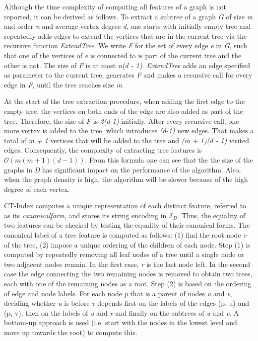 \documentclass{l4proj}
\newcommand{\fancyI}{\mathcal{I}}
\begin{document}
Although the time complexity of computing all features of a graph is not reported, it can be derived as follows. To extract a subtree of a graph \emph{G} of size \emph{m} and order \emph{n} and average vertex degree \emph{d}, one starts with initially empty tree and repeatedly adds edges to extend the vertices that are in the current tree via the recursive function \emph{ExtendTree}. We write \emph{F} for the set of every edge \emph{e} in \emph{G}, such that one of the vertices of \emph{e} is connected to is part of the current tree and the other is not. The size of \emph{F} is at most \emph{n(d - 1)}. \emph{ExtendTree} adds an edge specified as parameter to the current tree, generates \emph{F} and makes a recursive call for every edge in \emph{F}, until the tree reaches size \emph{m}.

At the start of the \gls{tree} extraction procedure, when adding the first edge to the empty tree, the vertices on both ends of the edge are also added as part of the tree. Therefore, the size of \emph{F} is \emph{2(d-1)} initially. After every recursive call, one more vertex is added to the tree, which introduces \emph{(d-1)} new edges. That makes a total of \emph{m + 1} vertices that will be added to the tree and \emph{(m + 1)(d - 1)} visited edges. Consequently, the complexity of extracting tree features is $\mathcal{O}(m(m + 1)(d - 1))$. From this formula one can see that the the size of the graphs in \emph{D} has significant impact on the performance of the algorithm. Also, when the graph density is high, the algorithm will be slower because of the high degree of each vertex.

CT-Index computes a unique representation of each distinct feature, referred to as its \emph{\gls{canonicalform}}, and stores its string encoding in $\fancyI_{D}$. Thus, the equality of two features can be checked by testing the equality of their canonical forms. The canonical label of a \gls{tree} feature is computed as follows: (1) find the root node \emph{r} of the tree, (2) impose a unique ordering of the children of each node. Step (1) is computed by repeatedly removing all leaf nodes of a \gls{tree} until a single node or two adjacent nodes remain. In the first case, \emph{r} is the last node left. In the second case the edge connecting the two remaining nodes is removed to obtain two \glspl{tree}, each with one of the remaining nodes as a root.
Step (2) is based on the ordering of edge and node labels. For each node \textit{p} that is a parent of nodes \textit{u} and \textit{v}, deciding whether \textit{u} is before \textit{v} depends first on the labels of the edges (p, u) and (p, v), then on the labels of \textit{u} and \textit{v} and finally on the subtrees of \textit{u} and \textit{v}. A bottom-up approach is used (i.e. start with the nodes in the lowest level and move up towards the root) to compute this.
\end{document}
